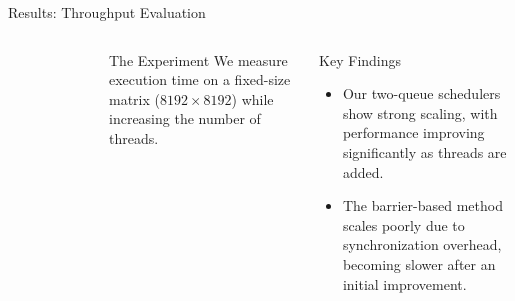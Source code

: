 \begin{frame}{Results: Throughput Evaluation}
\begin{columns}[c,onlytextwidth]
\begin{figure}
    \end{figure}

    \begin{block}{The Experiment}
      We measure execution time on a fixed-size matrix ($8192 \times 8192$) while increasing the number of threads.
    \end{block}
    
    \pause
    \begin{alertblock}{Key Findings}
      \begin{itemize}
        \item Our two-queue schedulers show strong scaling, with performance improving significantly as threads are added.
        \item The barrier-based method scales poorly due to synchronization overhead, becoming slower after an initial improvement.
      \end{itemize}
    \end{alertblock}

  \end{columns}
\end{frame}